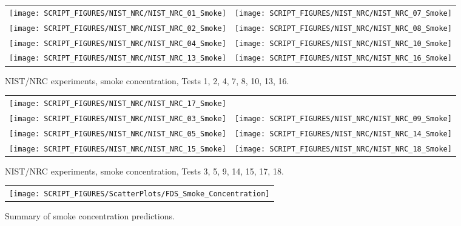 \begin{figure}[p]
\begin{tabular*}{\textwidth}{l@{\extracolsep{\fill}}r}
\texttt{[image: SCRIPT\_FIGURES/NIST\_NRC/NIST\_NRC\_01\_Smoke]} &
\texttt{[image: SCRIPT\_FIGURES/NIST\_NRC/NIST\_NRC\_07\_Smoke]} \\
\texttt{[image: SCRIPT\_FIGURES/NIST\_NRC/NIST\_NRC\_02\_Smoke]} &
\texttt{[image: SCRIPT\_FIGURES/NIST\_NRC/NIST\_NRC\_08\_Smoke]} \\
\texttt{[image: SCRIPT\_FIGURES/NIST\_NRC/NIST\_NRC\_04\_Smoke]} &
\texttt{[image: SCRIPT\_FIGURES/NIST\_NRC/NIST\_NRC\_10\_Smoke]} \\
\texttt{[image: SCRIPT\_FIGURES/NIST\_NRC/NIST\_NRC\_13\_Smoke]} &
\texttt{[image: SCRIPT\_FIGURES/NIST\_NRC/NIST\_NRC\_16\_Smoke]}
\end{tabular*}
\caption[NIST/NRC experiments, smoke concentration, Tests 1, 2, 4, 7, 8, 10, 13, 16]{NIST/NRC experiments, smoke concentration, Tests 1, 2, 4, 7, 8, 10, 13, 16.}
\end{figure}

\begin{figure}[p]
\begin{tabular*}{\textwidth}{l@{\extracolsep{\fill}}r}
\texttt{[image: SCRIPT\_FIGURES/NIST\_NRC/NIST\_NRC\_17\_Smoke]} &
 \\
\texttt{[image: SCRIPT\_FIGURES/NIST\_NRC/NIST\_NRC\_03\_Smoke]} &
\texttt{[image: SCRIPT\_FIGURES/NIST\_NRC/NIST\_NRC\_09\_Smoke]} \\
\texttt{[image: SCRIPT\_FIGURES/NIST\_NRC/NIST\_NRC\_05\_Smoke]} &
\texttt{[image: SCRIPT\_FIGURES/NIST\_NRC/NIST\_NRC\_14\_Smoke]} \\
\texttt{[image: SCRIPT\_FIGURES/NIST\_NRC/NIST\_NRC\_15\_Smoke]} &
\texttt{[image: SCRIPT\_FIGURES/NIST\_NRC/NIST\_NRC\_18\_Smoke]}
\end{tabular*}
\caption[NIST/NRC experiments, smoke concentration, Tests 3, 5, 9, 14, 15, 17, 18]{NIST/NRC experiments, smoke concentration, Tests 3, 5, 9, 14, 15, 17, 18.}
\end{figure}


\begin{figure}[p]
\begin{center}
\begin{tabular}{c}
\texttt{[image: SCRIPT\_FIGURES/ScatterPlots/FDS\_Smoke\_Concentration]}
\end{tabular}
\end{center}
\caption[Summary of smoke concentration predictions]{Summary of smoke concentration predictions.}
\end{figure}

